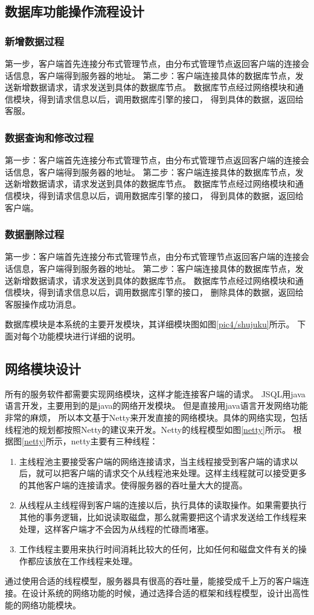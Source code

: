 \subsection{数据库功能操作流程设计}
\subsubsection{新增数据过程}
第一步，客户端首先连接分布式管理节点，由分布式管理节点返回客户端的连接会话信息，客户端得到服务器的地址。
第二步：客户端连接具体的数据库节点，发送新增数据请求，请求发送到具体的数据库节点。
数据库节点经过网络模块和通信模块，得到请求信息以后，调用数据库引擎的接口，
得到具体的数据，返回给客服。
\subsubsection{数据查询和修改过程}
第一步：客户端首先连接分布式管理节点，由分布式管理节点返回客户端的连接会话信息，客户端得到服务器的地址。
第二步：客户端连接具体的数据库节点，发送新增数据请求，请求发送到具体的数据库节点。
数据库节点经过网络模块和通信模块，得到请求信息以后，调用数据库引擎的接口，
得到具体的数据，返回给客户端。
\subsubsection{数据删除过程}
第一步：客户端首先连接分布式管理节点，由分布式管理节点返回客户端的连接会话信息，客户端得到服务器的地址。
第二步：客户端连接具体的数据库节点，发送新增数据请求，请求发送到具体的数据库节点。
数据库节点经过网络模块和通信模块，得到请求信息以后，调用数据库引擎的接口，
删除具体的数据，返回给客服操作成功消息。

数据库模块是本系统的主要开发模块，其详细模块图如图\ref{pic4/shujuku}所示。
下面对每个功能模块进行详细的说明。
\subsection{网络模块设计}
所有的服务软件都需要实现网络模块，这样才能连接客户端的请求。
JSQL用java语言开发，主要用到的是java的网络开发模块。
但是直接用java语言开发网络功能非常的麻烦，
所以本文基于Netty来开发直接的网络模块。具体的网络实现，包括
线程池的规划都按照Netty的建议来开发。Netty的线程模型如图\ref{netty}所示。
根据图\ref{netty}所示，netty主要有三种线程：
\begin{enumerate}[fullwidth,itemindent=2em,listparindent=2em]
	\item 主线程池主要接受客户端的网络连接请求，当主线程接受到客户端的请求以后，就可以把客户端的请求交个从线程池来处理。这样主线程就可以接受更多的其他客户端的连接请求。使得服务器的吞吐量大大的提高。
	\item 从线程从主线程得到客户端的连接以后，执行具体的读取操作。如果需要执行其他的事务逻辑，比如说读取磁盘，那么就需要把这个请求发送给工作线程来处理，这样客户端才不会因为从线程的忙碌而堵塞。
	\item 工作线程主要用来执行时间消耗比较大的任何，比如任何和磁盘文件有关的操作都应该放在工作线程来处理。
\end{enumerate}
通过使用合适的线程模型，服务器具有很高的吞吐量，能接受成千上万的客户端连接。在设计系统的网络功能的时候，通过选择合适的框架和线程模型，设计出高性能的网络功能模块。
